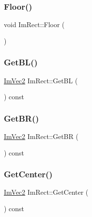 \hypertarget{struct_im_rect_a8fdf75a0c64ff29f65113cd9f8be77ab}{}\label{struct_im_rect_a8fdf75a0c64ff29f65113cd9f8be77ab} 
\subsubsection{\texorpdfstring{Floor()}{Floor()}}
{\footnotesize\ttfamily void Im\+Rect\+::\+Floor (\begin{DoxyParamCaption}{ }\end{DoxyParamCaption})}

\hypertarget{struct_im_rect_a59d9751bc7be6745dddf5b83b9155669}{}\label{struct_im_rect_a59d9751bc7be6745dddf5b83b9155669} 
\subsubsection{\texorpdfstring{Get\+B\+L()}{GetBL()}}
{\footnotesize\ttfamily \hyperlink{struct_im_vec2}{Im\+Vec2} Im\+Rect\+::\+Get\+BL (\begin{DoxyParamCaption}{ }\end{DoxyParamCaption}) const}

\hypertarget{struct_im_rect_ad2f2687254beed5a9b19bde0d6fa14f5}{}\label{struct_im_rect_ad2f2687254beed5a9b19bde0d6fa14f5} 
\subsubsection{\texorpdfstring{Get\+B\+R()}{GetBR()}}
{\footnotesize\ttfamily \hyperlink{struct_im_vec2}{Im\+Vec2} Im\+Rect\+::\+Get\+BR (\begin{DoxyParamCaption}{ }\end{DoxyParamCaption}) const}

\hypertarget{struct_im_rect_aae13f8003184fd84f29d27c3c074cf43}{}\label{struct_im_rect_aae13f8003184fd84f29d27c3c074cf43} 
\subsubsection{\texorpdfstring{Get\+Center()}{GetCenter()}}
{\footnotesize\ttfamily \hyperlink{struct_im_vec2}{Im\+Vec2} Im\+Rect\+::\+Get\+Center (\begin{DoxyParamCaption}{ }\end{DoxyParamCaption}) const}

